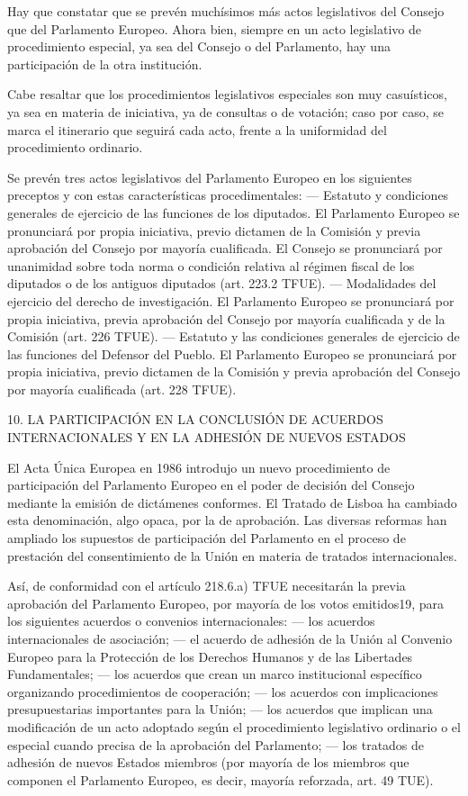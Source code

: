 \documentclass[10pt,a4paper]{article}
\begin{document}
Hay que constatar que se prevén muchísimos más actos legislativos del Consejo que del Parlamento Europeo. Ahora bien, siempre en un acto legislativo de procedimiento especial, ya sea del Consejo o del Parlamento, hay una participación de la otra institución. 

Cabe resaltar que los procedimientos legislativos especiales son muy casuísticos, ya sea en materia de iniciativa, ya de consultas o de votación; caso por caso, se marca el itinerario que seguirá cada acto, frente a la uniformidad del procedimiento ordinario. 

Se prevén tres actos legislativos del Parlamento Europeo en los siguientes preceptos y con estas características procedimentales:
— Estatuto y condiciones generales de ejercicio de las funciones de los diputados. El Parlamento Europeo se pronunciará por propia iniciativa, previo dictamen de la Comisión y previa aprobación del Consejo por mayoría cualificada. El Consejo se pronunciará por unanimidad sobre toda norma o condición relativa al régimen fiscal de los diputados o de los antiguos diputados (art. 223.2 TFUE).
— Modalidades del ejercicio del derecho de investigación. El Parlamento Europeo se pronunciará por propia iniciativa, previa aprobación del Consejo por mayoría cualificada y de la Comisión (art. 226 TFUE).
— Estatuto y las condiciones generales de ejercicio de las funciones del Defensor del Pueblo. El Parlamento Europeo se pronunciará por propia iniciativa, previo dictamen de la Comisión y previa aprobación del Consejo por mayoría cualificada (art. 228 TFUE).

10. LA PARTICIPACIÓN EN LA CONCLUSIÓN DE ACUERDOS INTERNACIONALES Y EN LA ADHESIÓN DE NUEVOS ESTADOS

El Acta Única Europea en 1986 introdujo un nuevo procedimiento  de participación del Parlamento Europeo en el poder de decisión del Consejo mediante la emisión de dictámenes conformes. El Tratado de Lisboa ha cambiado esta denominación, algo opaca, por la de aprobación. Las diversas reformas han ampliado los supuestos de participación del Parlamento en el proceso de prestación del consentimiento de la Unión en materia de tratados internacionales.

Así, de conformidad con el artículo 218.6.a) TFUE necesitarán la previa aprobación del Parlamento Europeo, por mayoría de los votos emitidos19, para los siguientes acuerdos o convenios internacionales:
— los acuerdos internacionales de asociación; 
— el acuerdo de adhesión de la Unión al Convenio Europeo para la Protección de los Derechos Humanos y de las Libertades Fundamentales;
— los acuerdos que crean un marco institucional específico organizando procedimientos de cooperación;
— los acuerdos con implicaciones presupuestarias importantes para la Unión;
— los acuerdos que implican una modificación de un acto adoptado según el procedimiento legislativo ordinario o el especial cuando precisa de la aprobación del Parlamento;
— los tratados de adhesión de nuevos Estados miembros (por mayoría de los miembros que componen el Parlamento Europeo, es decir, mayoría reforzada, art. 49 TUE).
\end{document}
